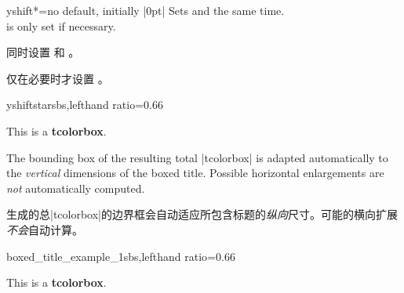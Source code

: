 \begin{boxTcbKey}{yshift*}{=}{no default, initially |0pt|}
Sets  and 
the same time.\\
 is only set if necessary.

同时设置  和 。

仅在必要时才设置 。
\begin{exdispExample*}{yshiftstar}{sbs,lefthand ratio=0.66}
\begin{tcolorbox}[enhanced,title=My title,
  attach boxed title to top center={yshift*=-3mm},
  boxed title style={size=small,colback=blue}]
  This is a \textbf{tcolorbox}.
\end{tcolorbox}
\end{exdispExample*}
\end{boxTcbKey}

\begin{marker}
The bounding box of the resulting total |tcolorbox| is adapted automatically to the
\emph{vertical} dimensions of the boxed title. Possible horizontal enlargements
are \emph{not} automatically computed.

生成的总|tcolorbox|的边界框会自动适应所包含标题的\emph{纵向}尺寸。可能的横向扩展\emph{不会}自动计算。
\end{marker}


\begin{exdispExample*}{boxed_title_example_1}{sbs,lefthand ratio=0.66}
\begin{tcolorbox}[enhanced,title=My title,
  attach boxed title to top left=
    {xshift=-2mm,yshift=-2mm},
  boxed title style={size=small,colback=blue},
  show bounding box]
  This is a \textbf{tcolorbox}.
\end{tcolorbox}
\end{exdispExample*}
